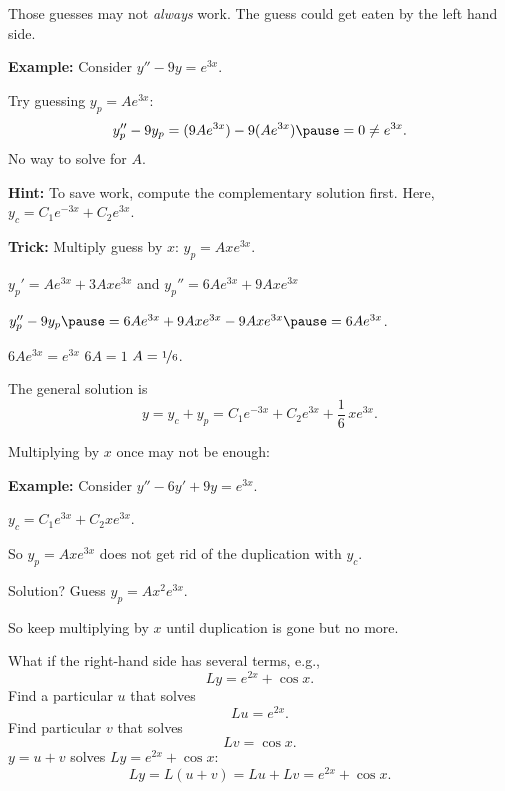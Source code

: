 \documentclass[10pt,aspectratio=169]{beamer}
\begin{document}
\begin{frame}
Those guesses may not \emph{always} work. \pause
The guess could get eaten by the left hand side.

\medskip
\pause

\textbf{Example:}
Consider
\quad $y'' - 9y = e^{3x}$.

\medskip
\pause

Try guessing \quad $y_p = Ae^{3x}$:
\pause
\[
y_p''-9y_p = (9Ae^{3x}) - 9(Ae^{3x}) \pause = 0 \neq e^{3x} .
\]
\pause
No way to solve for $A$.

\medskip
\pause

\textbf{Hint:} To save work, compute the complementary solution first.
Here, $y_c = C_1 e^{-3x} + C_2 e^{3x}$.

\medskip
\pause

\textbf{Trick:} Multiply guess by $x$: \quad $y_p = Axe^{3x}$.

\medskip
\pause

\quad $y_p' = Ae^{3x} + 3Axe^{3x}$ \quad and \quad $y_p'' = 6Ae^{3x} + 9Axe^{3x}$

\medskip
\pause

\quad $y_p'' -9y_p \pause = 6Ae^{3x} + 9Axe^{3x} - 9Axe^{3x} \pause = 6Ae^{3x}$.

\medskip
\pause

\thus \quad $6Ae^{3x} = e^{3x}$ \wthus $6A = 1$ \wthus $A=\nicefrac{1}{6}$.

\medskip
\pause

The general solution is
\[
y = y_c + y_p = 
C_1 e^{-3x} + C_2 e^{3x} + \frac{1}{6}\,xe^{3x} .
\]
\end{frame}

\begin{frame}
Multiplying by $x$ once may not be enough:

\medskip

\textbf{Example:}
Consider
\quad
$y''-6y'+9y = e^{3x}$.

\medskip
\pause

\quad $y_c = C_1 e^{3x} + C_2 x e^{3x}$.

\medskip
\pause

So $y_p = A xe^{3x}$ does not get rid of the duplication with $y_c$.

\medskip
\pause

Solution? \pause Guess \quad $y_p = Ax^2e^{3x}$.

\pause
\medskip
So keep multiplying by $x$ until duplication is gone but no more.
\end{frame}

\begin{frame}
What if the right-hand side has several terms, e.g.,
\[
Ly = e^{2x} + \cos x .
\]
\pause
Find a particular $u$ that solves
\[
Lu = e^{2x} .
\]
\pause
Find particular $v$ that solves
\[
Lv = \cos x .
\]
\pause
$y=u+v$ \quad solves \quad
$Ly = e^{2x} + \cos x$:
\[
Ly=L(u+v) = Lu+Lv = e^{2x} + \cos x .
\]
\end{frame}
\end{document}
